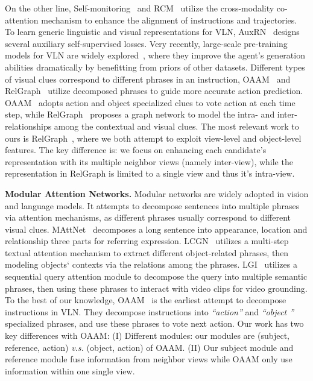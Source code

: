 \documentclass[sigconf]{acmart}
\begin{document}
On the other line, Self-monitoring~\cite{ma2019self-monitoring} and RCM~\cite{wang2019rcm} utilize the cross-modality co-attention mechanism to enhance the alignment of instructions and trajectories.
To learn generic linguistic and visual representations for VLN, AuxRN~\cite{zhu2020self-supervised} designs several auxiliary self-supervised losses. 
Very recently, large-scale pre-training models for VLN are widely explored~\cite{li2019press,hao2020prevelant,arjun2020vln-bert,hong2020vln-bert}, where they improve the agent's generation abilities dramatically by benefitting from priors of other datasets. 
Different types of visual clues correspond to different phrases in an instruction, OAAM~\cite{qi2020oaam} and RelGraph~\cite{hong2020relgraph} utilize decomposed phrases to guide more accurate action prediction.
OAAM~\cite{qi2020oaam} adopts action and object specialized clues to vote action at each time step, while RelGraph~\cite{hong2020relgraph} proposes a graph network to model the intra- and inter-relationships among the contextual and visual clues. 
The most relevant work to ours is RelGraph~\cite{hong2020relgraph}, where we both attempt to exploit view-level and object-level features. The key difference is: we focus on enhancing each candidate's representation with its multiple neighbor views (namely inter-view), while the representation in RelGraph is limited to a single view and thus it's intra-view. 

\noindent\textbf{Modular Attention Networks.} Modular networks are widely adopted in vision and language models. It attempts to decompose sentences into multiple phrases via attention mechanisms, as different phrases usually correspond to different visual clues.
MAttNet~\cite{yu2018mattnet} decomposes a long sentence into appearance, location and relationship three parts for referring expression. 
LCGN~\cite{hu2019lcgn} utilizes a multi-step textual attention mechanism to extract different object-related phrases, then modeling objects‘ contexts via the relations among the phrases.
LGI~\cite{mun2020lgi} utilizes a sequential query attention module to decompose the query into multiple semantic phrases, then using these phrases to interact with video clips for video grounding. 
To the best of our knowledge, OAAM~\cite{qi2020oaam} is the earliest attempt to decompose instructions in VLN. They decompose instructions into \textit{``action''} and \textit{``object ''} specialized phrases, and use these phrases to vote next action.
Our work has two key differences with OAAM: (I) Different modules: our modules are (subject, reference, action) \textit{v.s.} (object, action) of OAAM. (II) Our subject module and reference module fuse information from neighbor views while OAAM only use information within one single view.
\end{document}
